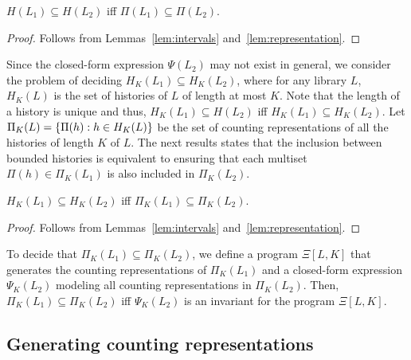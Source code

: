 
\begin{lemma}

  $H(L_1) \subseteq H(L_2)$ iff $\Pi(L_1) \subseteq \Pi(L_2)$.

\end{lemma}

\begin{proof}

  Follows from Lemmas~\ref{lem:intervals} and~\ref{lem:representation}.

\end{proof}

Since the closed-form expression $\Psi(L_2)$ may not exist in general, we consider the problem of deciding
$H_K(L_1) \subseteq H_K(L_2)$, where for any library $L$, $H_K(L)$ is the set of histories of $L$ of length at most $K$.
Note that the length of a history is unique and thus, $H_K(L_1) \subseteq H(L_2)$ iff $H_K(L_1) \subseteq H_K(L_2)$.
Let $\Pi_K(L)={\{ \Pi(h):h\in H_K(L) \}}$ be the set of counting representations of all the histories of length $K$ of $L$.
The next results states that the inclusion between bounded histories is equivalent to ensuring that each multiset 
$\Pi(h) \in \Pi_K(L_1)$ is also included in $\Pi_K(L_2)$.

\begin{lemma}

  $H_K(L_1) \subseteq H_K(L_2)$ iff $\Pi_K(L_1) \subseteq \Pi_K(L_2)$.

\end{lemma}

\begin{proof}

  Follows from Lemmas~\ref{lem:intervals} and~\ref{lem:representation}.

\end{proof}

To decide that $\Pi_K(L_1) \subseteq \Pi_K(L_2)$, we define a program $\Xi[L,K]$ that generates the counting representations of $\Pi_K(L_1)$
and a closed-form expression $\Psi_K(L_2)$ modeling all counting representations in $\Pi_K(L_2)$. Then, $\Pi_K(L_1) \subseteq \Pi_K(L_2)$ iff 
$\Psi_K(L_2)$ is an invariant for the program $\Xi[L,K]$.

\subsection{Generating counting representations}



